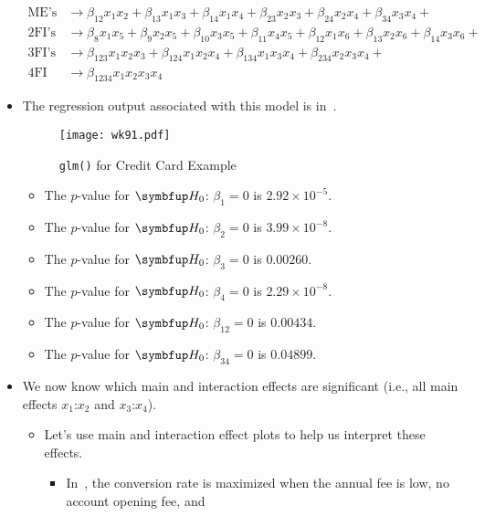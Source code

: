 \begin{itemize}
\begin{align*}
              \text{ME's}      & \to\beta_{12}x_1x_2+\beta_{13}x_1x_3+\beta_{14}x_1x_4+\beta_{23}x_2x_3+\beta_{24}x_2x_4+\beta_{34}x_3x_4+              \\
              \text{2FI's}     & \to\beta_{8}x_1x_5+\beta_9x_2x_5+\beta_{10}x_3x_5+\beta_{11}x_4x_5+\beta_{12}x_1x_6+\beta_{13}x_2x_6+\beta_{14}x_3x_6+ \\
              \text{3FI's}     & \to\beta_{123}x_1x_2x_3+\beta_{124}x_1x_2x_4+\beta_{134}x_1x_3x_4+\beta_{234}x_2x_3x_4+                                \\
              \text{4FI}       & \to\beta_{1234}x_1x_2x_3x_4
          \end{align*}
    \item The regression output associated with this model is in~.
          \begin{figure}[!htbp]
              \centering
              \texttt{[image: wk91.pdf]}
              \caption{\texttt{glm()} for Credit Card Example}\label{fig:creditcardglm}
          \end{figure}
          \begin{itemize}
              \item The $ p $-value for $ \HN $: $ \beta_1=0 $ is $ 2.92\times 10^{-5} $.
              \item The $ p $-value for $ \HN $: $ \beta_2=0 $ is $ 3.99\times 10^{-8} $.
              \item The $ p $-value for $ \HN $: $ \beta_3=0 $ is $ 0.00260 $.
              \item The $ p $-value for $ \HN $: $ \beta_4=0 $ is $ 2.29\times 10^{-8} $.
              \item The $ p $-value for $ \HN $: $ \beta_{12}=0 $ is $ 0.00434 $.
              \item The $ p $-value for $ \HN $: $ \beta_{34}=0 $ is $ 0.04899 $.
          \end{itemize}
    \item We now know which main and interaction effects are significant (i.e., all main effects $ x_1 $:$ x_2 $ and $ x_3 $:$ x_4 $).
          \begin{itemize}
              \item Let's use main and interaction effect plots to help us interpret these effects.
                    \begin{itemize}
                        \item In~, the conversion rate is maximized when the annual fee is low, no account opening fee, and

\end{itemize}
\end{itemize}
\end{itemize}
